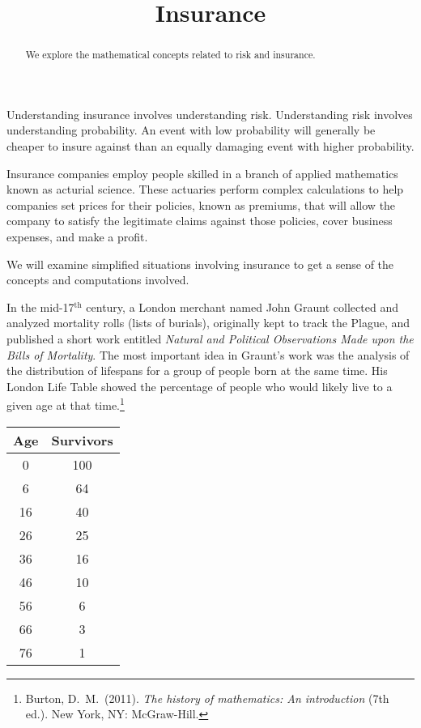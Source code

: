 \documentclass{ximera}
\title{Insurance}
\begin{document}
\begin{abstract}
We explore the mathematical concepts related to risk and insurance.
\end{abstract}

\maketitle

Understanding insurance involves understanding risk. Understanding risk involves understanding probability. An event with low probability will generally be cheaper to insure against than an equally damaging event with higher probability.

Insurance companies employ people skilled in a branch of applied mathematics known as acturial science. These actuaries perform complex calculations to help companies set prices for their policies, known as premiums, that will allow the company to satisfy the legitimate claims against those policies, cover business expenses, and make a profit.

We will examine simplified situations involving insurance to get a sense of the concepts and computations involved.

In the mid-17$^\text{th}$ century, a London merchant named John Graunt collected and analyzed mortality rolls (lists of burials), originally kept to track the Plague, and published a short work entitled \textit{Natural and Political Observations Made upon the Bills of Mortality}. The most important idea in Graunt's work was the analysis of the distribution of lifespans for a group of people born at the same time. His London Life Table showed the percentage of people who would likely live to a given age at that time.\footnote{Burton, D.\ M.\ (2011). \textit{The history of mathematics: An introduction} (7th ed.). New York, NY: McGraw-Hill.}
\begin{center}
\begin{tabular}{@{}cc@{}}\toprule
\textbf{Age} & \textbf{Survivors}\\\midrule
0 & 100\\
6 & 64\\
16 & 40\\
26 & 25\\
36 & 16\\
46 & 10\\
56 & 6\\
66 & 3\\
76 & 1\\\bottomrule
\end{tabular}
\end{center}
\end{document}
